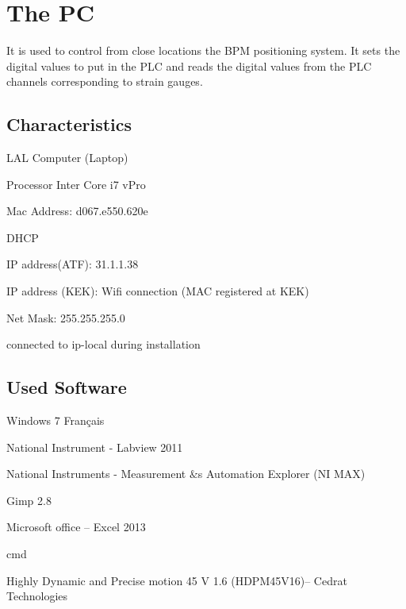 \section{The PC}
It is used to control from close locations the BPM positioning system. It sets the digital values to put in the PLC and reads the digital values from the PLC channels corresponding to strain gauges.\par
\subsection{Characteristics}
LAL Computer (Laptop)\par
Processor Inter Core i7 vPro\par
Mac Address: d067.e550.620e\par
DHCP\par
IP address(ATF): 31.1.1.38\par
IP address (KEK): Wifi connection (MAC registered at KEK)\par
Net Mask: 255.255.255.0\par
connected to ip-local during installation\par

\subsection{Used Software}
Windows 7 Français\par
National Instrument - Labview 2011\par
National Instruments - Measurement $\&$s Automation Explorer (NI MAX)\par
Gimp 2.8\par
Microsoft office – Excel 2013\par
cmd\par
Highly Dynamic and Precise motion 45 V 1.6 (HDPM45V16)– Cedrat Technologies\par
